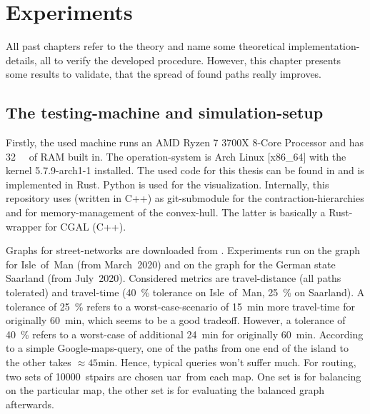 \chapter{Experiments}
\label{chap:experiments}

All past chapters refer to the theory and name some theoretical implementation-details, all to verify the developed procedure.
However, this chapter presents some results to validate, that the spread of found paths really improves.

\section{The testing-machine and simulation-setup}

    Firstly, the used machine runs an AMD Ryzen 7 3700X 8-Core Processor and has \si{\num{32} \giga\byte} of RAM built in.
    The operation-system is Arch Linux [x86\_64] with the kernel 5.7.9-arch1-1 installed.
    The used code for this thesis can be found in \cite{github:dominicparga/osmgraphing} and is implemented in Rust.
    Python is used for the visualization.
    Internally, this repository uses \cite{github:lesstat/multi-ch-constructor} (written in C++) as git-submodule for the \gls{contraction-hierarchies} and \cite{github:lesstat/nd-triangulation} for memory-management of the convex-hull.
    The latter is basically a Rust-wrapper for CGAL (C++).

    Graphs for street-networks are downloaded from \cite{osm}.
    Experiments run on the graph for Isle~of~Man (from March~2020) and on the graph for the German state Saarland (from July~2020).
    Considered \glspl{metric} are travel-distance (all paths tolerated) and travel-time (\si{40 \percent} tolerance on Isle~of~Man, \si{25 \percent} on Saarland).
    A tolerance of \si{25 \percent} refers to a worst-case-scenario of \si{15 \minute} more travel-time for originally \si{60 \minute}, which seems to be a good tradeoff.
    However, a tolerance of \si{40 \percent} refers to a worst-case of additional \si{24 \minute} for originally \si{60 \minute}.
    According to a simple Google-maps-query, one of the paths from one end of the island to the other takes $\approx \si{45 \minute}$.
    Hence, typical queries won't suffer much.
    For routing, two sets of \num{10000}~\glspl{stpair} are chosen \gls{uar}\ from each map. One set is for \gls{balancing} on the particular map, the other set is for evaluating the balanced graph afterwards.

